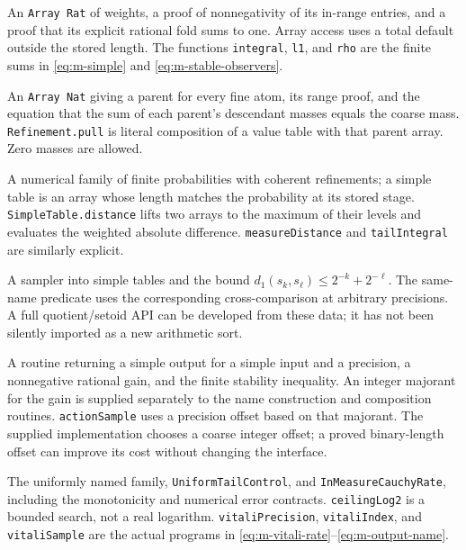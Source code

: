 \begin{description}[style=nextline,leftmargin=0pt,labelwidth=0pt,labelsep=0pt]
\item[\texttt{FiniteProbability}]
An \texttt{Array Rat} of weights, a proof of nonnegativity of its in-range
entries, and a proof that its explicit rational fold sums to one. Array
access uses a total default outside the stored length. The functions
\texttt{integral}, \texttt{l1}, and \texttt{rho} are the finite sums in
\eqref{eq:m-simple} and \eqref{eq:m-stable-observers}.

\item[\texttt{Refinement}]
An \texttt{Array Nat} giving a parent for every fine atom, its range
proof, and the equation that the sum of each parent's descendant masses
equals the coarse mass. \texttt{Refinement.pull} is literal composition
of a value table with that parent array. Zero masses are allowed.

\item[\texttt{ProbabilityTower} and \texttt{SimpleTable}]
A numerical family of finite probabilities with coherent refinements;
a simple table is an array whose length matches the probability at its
stored stage. \texttt{SimpleTable.distance} lifts two arrays to the
maximum of their levels and evaluates the weighted absolute difference.
\texttt{measureDistance} and \texttt{tailIntegral} are similarly explicit.

\item[\texttt{RegularL1Name} and \texttt{SameL1Name}]
A sampler into simple tables and the bound
$d_1(s_k,s_\ell)\le2^{-k}+2^{-\ell}$.
The same-name predicate uses the corresponding cross-comparison at
arbitrary precisions. A full quotient/setoid API can be developed from
these data; it has not been silently imported as a new arithmetic sort.

\item[\texttt{DenseAction}]
A routine returning a simple output for a simple input and a precision,
a nonnegative rational gain, and the finite stability inequality.
An integer majorant for the gain is supplied separately to the name
construction and composition routines. \texttt{actionSample} uses a
precision offset based on that majorant.
The supplied implementation chooses a coarse integer offset; a proved
binary-length offset can improve its cost without changing the interface.

\item[\texttt{VitaliData}]
The uniformly named family, \texttt{UniformTailControl}, and
\texttt{InMeasureCauchyRate}, including the monotonicity and numerical
error contracts. \texttt{ceilingLog2} is a bounded search, not a real
logarithm. \texttt{vitaliPrecision}, \texttt{vitaliIndex}, and
\texttt{vitaliSample} are the actual programs in
\eqref{eq:m-vitali-rate}--\eqref{eq:m-output-name}.
\end{description}

